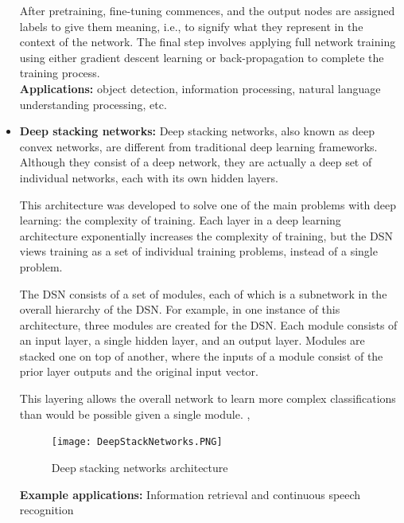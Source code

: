 \begin{itemize}
    After pretraining, fine-tuning commences, and the output nodes are assigned labels to give them meaning, i.e., to signify what they represent in the context of the network. The final step involves applying full network training using either gradient descent learning or back-propagation to complete the training process. \\
    \textbf{Applications: } object detection, information processing, natural language understanding processing, etc. \\
    \item \textbf{Deep stacking networks: } Deep stacking networks, also known as deep convex networks, are different from traditional deep learning frameworks. Although they consist of a deep network, they are actually a deep set of individual networks, each with its own hidden layers. 

    This architecture was developed to solve one of the main problems with deep learning: the complexity of training. Each layer in a deep learning architecture exponentially increases the complexity of training, but the DSN views training as a set of individual training problems, instead of a single problem.
    
    The DSN consists of a set of modules, each of which is a subnetwork in the overall hierarchy of the DSN. For example, in one instance of this architecture, three modules are created for the DSN. Each module consists of an input layer, a single hidden layer, and an output layer. Modules are stacked one on top of another, where the inputs of a module consist of the prior layer outputs and the original input vector. 
    
    This layering allows the overall network to learn more complex classifications than would be possible given a single module. \cite{deng2014tutorial}, \cite{madhavan2017deep}
    
    \begin{figure}[H]
        \centering
        \texttt{[image: DeepStackNetworks.PNG]}
        \caption{Deep stacking networks architecture \cite{madhavan2017deep}}
        \label{fig:Deep stacking networks}
    \end{figure}
    \textbf{Example applications:} Information retrieval and continuous speech recognition
    

\end{itemize}
